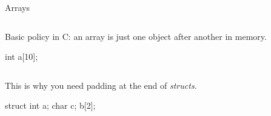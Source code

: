 \documentclass{plt}
\begin{document}
\begin{frame}[t,fragile]{Arrays}

\begin{columns}
  \begin{column}{0.5\textwidth}
Basic policy in C: an array is just one
object after another in memory.

\medskip

\begin{C}
int a[10];
\end{C}
  \end{column}
  \begin{column}{0.5\textwidth}
  \end{column}
\end{columns}

\vspace{1pc}

\begin{columns}
  \begin{column}{0.5\textwidth}
This is why you need padding at the end of \emph{structs}.

\medskip

\begin{C}
struct {
  int a;
  char c;
} b[2];
\end{C}
  \end{column}
  \begin{column}{0.5\textwidth}
  \end{column}
\end{columns}

\end{frame}
\end{document}
